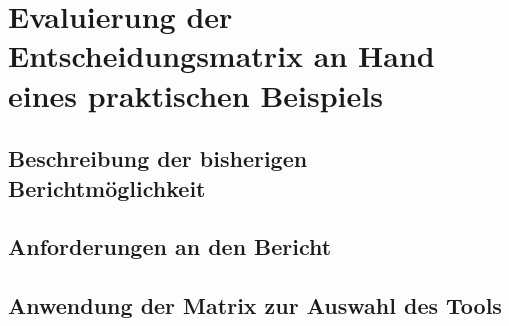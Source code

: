 \chapter{Evaluierung der Entscheidungsmatrix an Hand eines praktischen Beispiels}

\section{Beschreibung der bisherigen Berichtmöglichkeit}
\label{Kundenanforderungen}
\newpage
\section{Anforderungen an den Bericht}
\newpage
\section{Anwendung der Matrix zur Auswahl des Tools}